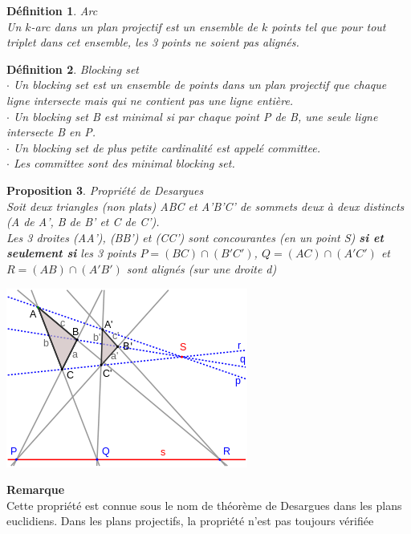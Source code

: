 \documentclass[a4paper]{article}
\newtheorem{Def}{Définition}[section]
\newtheorem{Prop}[Def]{Proposition}
\begin{document}
\begin{Def}{Arc} \\
  Un $k$-arc dans un plan projectif est un ensemble de $k$ points tel que pour tout triplet dans cet ensemble, les 3 points ne soient pas alignés.
\end{Def}
\vspace{1\baselineskip}
\begin{Def}{Blocking set}\\
 $\cdot$ Un \textit{blocking set} est un ensemble de points dans un plan projectif que chaque ligne intersecte mais qui ne contient pas une ligne entière.\\
  $\cdot$ Un \textit{blocking set} B est minimal si par chaque point P de B, une seule ligne intersecte B en P.\\
  $\cdot$ Un \textit{blocking set} de plus petite cardinalité est appelé \textit{committee}.\\
 $\cdot$  Les \textit{committee} sont des \textit{minimal blocking set}.
\end{Def}
\vspace{1\baselineskip}
\begin{Prop}{Propriété de Desargues}\\
  Soit deux triangles (non plats) ABC et A'B'C' de sommets deux à deux distincts (A de A', B de B' et C de C'). \\
  Les 3 droites (AA'), (BB') et (CC') sont concourantes (en un point S) \textbf{si et seulement si} les 3 points $P = (BC) \cap (B'C')$, $Q = (AC) \cap (A'C')$ et $R = (AB) \cap (A'B')$ sont alignés (sur une droite d)
  \end{Prop}
\begin{center}
\includegraphics[scale=0.6]{desargues.png}  
\end{center}
\vspace{1\baselineskip}
\textbf{Remarque}\\
Cette propriété est connue sous le nom de théorème de Desargues dans les plans euclidiens. Dans les plans projectifs, la propriété n'est pas toujours vérifiée  
\newpage
\end{document}
